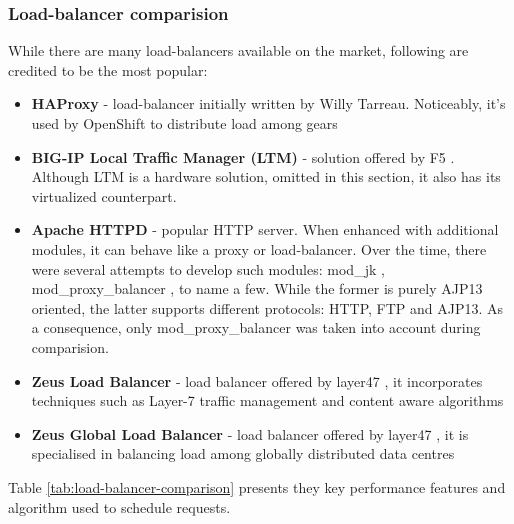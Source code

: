 \subsubsection{Load-balancer comparision}

While there are many load-balancers available on the market, following are credited to be the most popular:
\begin{itemize}
 \item \textbf{HAProxy} \cite{HAProxy} - load-balancer initially written by Willy Tarreau. Noticeably, it's used by OpenShift \cite{OpenShift} to distribute load among gears \cite{OpenShiftScaling}
 \item \textbf{BIG-IP Local Traffic Manager (LTM)} - solution offered by F5 \cite{F5}. Although LTM is a hardware solution, omitted in this section, it also has its virtualized counterpart.
 \item \textbf{Apache HTTPD} \cite{ApacheHTTPD} - popular HTTP server. When enhanced with additional modules, it can behave like a proxy or load-balancer. Over the time, there were several attempts to develop such modules: mod\_jk \cite{ApacheModJk}, mod\_proxy\_balancer \cite{ApacheModProxyBalancer}, to name a few. While the former is purely AJP13 oriented, the latter supports different protocols: HTTP, FTP and AJP13. As a consequence, only mod\_proxy\_balancer was taken into account during comparision. 
 \item \textbf{Zeus Load Balancer} \cite{Zeus} - load balancer offered by layer47 \cite{Layer47}, it incorporates techniques such as Layer-7 traffic management and content aware algorithms
 \item \textbf{Zeus Global Load Balancer} \cite{ZeusGlobal} - load balancer offered by layer47 \cite{Layer47}, it is specialised in balancing load among globally distributed data centres
 
\end{itemize}

Table \ref{tab:load-balancer-comparison} presents they key performance features and algorithm used to schedule requests.

